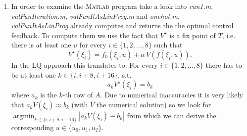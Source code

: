 \documentclass[12pt,pdftex,a4paper]{scrartcl}
\DeclareMathOperator*{\argmin}{argmin}
\begin{document}
\begin{enumerate}
	\item In order to examine the \textsc{Matlab} program take a look into \emph{run1.m}, \emph{valFunIteration.m}, \emph{valFunItAsLinProg.m} and \emph{onehot.m}.\\
	\emph{valFunItAsLinProg} already computes and returns the the optimal control feedback.
	To compute them we use the fact that $V^\star$ is a fix point of $T$, i.e. there is at least one $u$ for every $i \in \{1,2,\ldots ,8\}$ such that
	\begin{equation*}
		V^\star(\xi_i) =  f_0(\xi_i,u) + \alpha\,V(f(\xi_i,u)).
	\end{equation*}
	In the LQ approach this translates to: For every $i \in \{1,2,\ldots ,8\}$ there has to be at least one $k \in \{i, i+8, i+16\}$, s.t.
	\begin{equation*}
		a_k V^\star(\xi_i) = b_k
	\end{equation*}
	where $a_k$ is the $k$-th row of $A$. Due to numerical inaccuracies it is very likely that $a_k \bar{V}(\xi_i) \approx b_k$ (with $\bar{V}$ the numerical solution) so we look for $\argmin_{k \in \{i, i+8, i+16\}} |a_k \bar{V}(\xi_i) - b_k|$ from which we can derive the corresponding $u\in\{u_0,u_1,u_2\}$.
\end{enumerate}


\newpage
\end{document}
